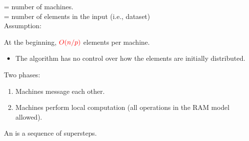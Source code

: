 \documentclass{beamer}
\def\vgap{\vspace{5mm}}
\begin{document}
\begin{frame}
\begin{small}
    \vgap
    
    \vgap 

     = number of machines. \\ 
     = number of elements in the input (i.e., dataset) \\
    Assumption: 
    
    \vgap 
    
    At the beginning, $\textcolor{red}{O(n / p)}$ elements per machine. 
    \begin{itemize} 
        \item The algorithm has no control over how the elements are initially distributed.
    \end{itemize}

    
\end{small}
\end{frame}
\begin{frame}
\begin{small}
    
    \vgap
    
    
    Two phases: 
    
    \begin{enumerate} 
        \item Machines message each other. 
        
        \item Machines perform local computation (all operations in the RAM model allowed). 
        
    \end{enumerate}

    \vgap
   
    An  is a sequence of supersteps. 
    
    
\end{small}
\end{frame}
\end{document}
